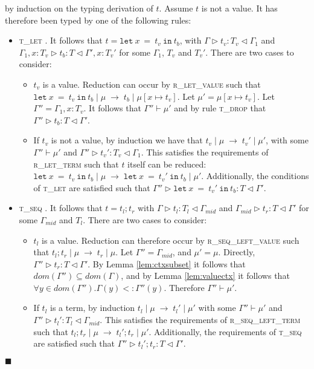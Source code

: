 \documentclass[preprint]{sigplanconf}
\newcommand{\lemref}[1]{Lemma \ref{#1}}
\newcommand{\rlett}{\textsc{r\_let\_term} }
\newcommand{\rletv}{\textsc{r\_let\_value} }
\newcommand{\rseqlt}{\textsc{r\_seq\_left\_term} }
\newcommand{\rseqlv}{\textsc{r\_seq\_left\_value} }
\newcommand{\tlet}{\textsc{t\_let} }
\newcommand{\tseq}{\textsc{t\_seq} }
\newcommand{\tdrop}{\textsc{t\_drop} }
\newcommand{\typerule}[4]{#1 \triangleright #2 : #3 \triangleleft #4}
\newcommand{\oprule}[4]{#1 \mid #2\;\longrightarrow\;#3 \mid #4}
\newcommand{\lett}[3]{\mathtt{let}\:#1\:\mathtt{=}\:#2\:\mathtt{in}\:#3}
\newcommand{\qed}{$\blacksquare$}
\newenvironment{proof}{\vspace{1ex}\noindent{\bf Proof}\hspace{0.5em}}
  {\hfill\qed\vspace{1ex}}
\begin{document}
\begin{proof}
by induction on the typing derivation of $t$. Assume $t$ is not a value. It has
therefore been typed by one of the following rules:

\begin{itemize}
\item \tlet. It follows that $t = \lett{x}{t_v}{t_b}$, with
$\typerule{\Gamma}{t_v}{T_v}{\Gamma_1}$ and
$\typerule{\Gamma_1, x : T_v}{t_b}{T}{\Gamma', x : T_v'}$ for some
$\Gamma_1$, $T_v$ and $T_v'$.
There are two cases to consider:

  \begin{itemize}
  \item $t_v$ is a value.
  Reduction can occur by \rletv such that 
  $\oprule{\lett{x}{t_v}{t_b}}{\mu}{t_b}{\mu [ x \mapsto t_v ]}$.
  Let $\mu' = \mu [ x \mapsto t_v ]$. Let $\Gamma'' = \Gamma_1, x : T_v$.
  It follows that $\Gamma'' \vdash \mu'$ and by rule \tdrop that
  $\typerule{\Gamma''}{t_b}{T}{\Gamma'}$.

  \item If $t_v$ is not a value, 
  by induction we have that $\oprule{t_v}{\mu}{t_v'}{\mu'}$, with
  some $\Gamma'' \vdash \mu'$ and $\typerule{\Gamma''}{t_v'}{T_v}{\Gamma_1}$.
  This satisfies the requirements of \rlett such that $t$ itself can be reduced:
  $\oprule{\lett{x}{t_v}{t_b}}{\mu}{\lett{x}{t_v'}{t_b}}{\mu'}$.
  Additionally, the conditions of \tlet are satisfied such that
  $\typerule{\Gamma''}{\lett{x}{t_v'}{t_b}}{T}{\Gamma'}$.

  \end{itemize}

\item \tseq. It follows that $t = t_l ; t_r$ with
$\typerule{\Gamma}{t_l}{T_l}{\Gamma_{mid}}$ and
$\typerule{\Gamma_{mid}}{t_r}{T}{\Gamma'}$ for some $\Gamma_{mid}$ and $T_l$.
There are two cases to consider:

  \begin{itemize}
  \item $t_l$ is a value. Reduction can therefore occur by
  \rseqlv such that
  $\oprule{t_l ; t_r}{\mu}{t_r}{\mu}$. 
  Let $\Gamma'' = \Gamma_{mid}$, and $\mu' = \mu$.
  Directly, $\typerule{\Gamma''}{t_r}{T}{\Gamma'}$.
  By \lemref{lem:ctxsubset} it follows that $dom(\Gamma'') \subseteq dom(\Gamma)$,
  and by \lemref{lem:valuectx} it follows that 
  $\forall y \in dom(\Gamma'') . \Gamma(y) <: \Gamma''(y)$.
  Therefore $\Gamma'' \vdash \mu'$.

  \item If $t_l$ is a term, by induction $\oprule{t_l}{\mu}{t_l'}{\mu'}$
  with some $\Gamma'' \vdash \mu'$ and
  $\typerule{\Gamma''}{t_l'}{T_l}{\Gamma_{mid}}$.
  This satisfies the requirements of \rseqlt
  such that $\oprule{t_l ; t_r}{\mu}{t_l' ; t_r}{\mu'}$.
  Additionally, the requirements of \tseq are satisfied such that
  $\typerule{\Gamma''}{t_l'; t_r}{T}{\Gamma'}$.


\end{itemize}
\end{itemize}
\end{proof}
\end{document}
